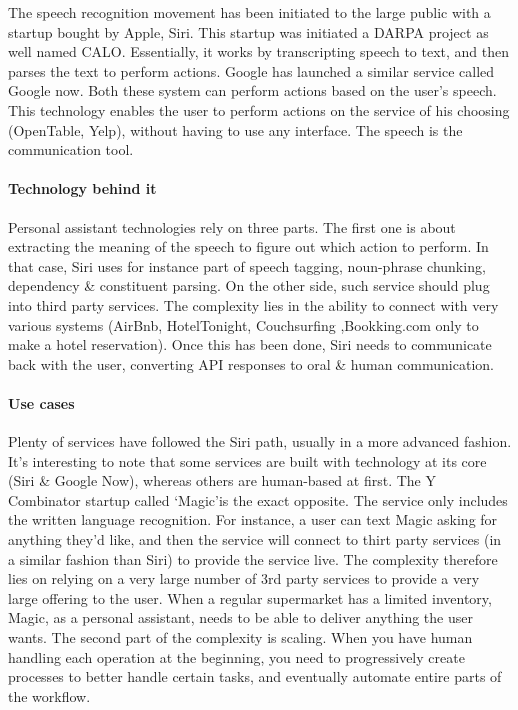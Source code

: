 \documentclass[12pt]{article}
\begin{document}
The speech recognition movement has been initiated to the large public with a
startup bought by Apple, Siri. This startup was initiated a DARPA project as
well named CALO. Essentially, it works by transcripting speech to text, and then
parses the text to perform actions. Google has launched a similar service called
Google now. Both these system can perform actions based on the user's speech.
This technology enables the user to perform actions on the service of his
choosing (OpenTable, Yelp), without having to use any interface. The speech is
the communication tool.
\\

\paragraph{Technology behind it}
Personal assistant technologies rely on three parts.
The first one is about extracting the meaning of the speech to figure out which
action to perform. In that case, Siri uses for instance part of speech tagging,
noun-phrase chunking, dependency \& constituent parsing. On the other side,
such service should plug into third party services. The complexity lies in the
ability to connect with very various systems (AirBnb, HotelTonight, Couchsurfing
,Bookking.com only to make a hotel reservation). Once this has been done, Siri
needs to communicate back with the user, converting API responses to oral \&
human communication.

\paragraph{Use cases}

Plenty of services have followed the Siri path, usually in a more advanced
fashion. It's interesting to note that some services are built with technology
at its core (Siri \& Google Now), whereas others are human-based at first. The Y
Combinator startup called \lq Magic\rq  is the exact opposite. The service only
includes the written language recognition. For instance, a user can text Magic
asking for anything they'd like, and then the service will connect to thirt
party services (in a similar fashion than Siri) to provide the service live. The
complexity therefore lies on relying on a very large number of 3rd party
services to provide a very large offering to the user. When a regular supermarket
has a limited inventory, Magic, as a personal assistant, needs to be able to
deliver anything the user wants. The second part of the complexity is scaling.
When you have human handling each operation at the beginning, you need to
progressively create processes to better handle certain tasks, and eventually
automate entire parts of the workflow.
\end{document}
